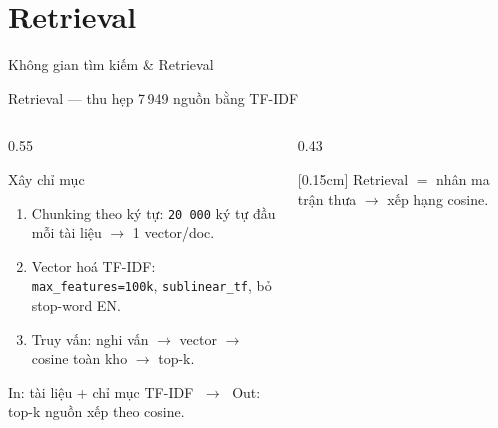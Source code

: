 \documentclass[aspectratio=169,11pt]{beamer}
\def\textbf#1{#1}%
\def\\{ }%
\begin{document}
\section{Retrieval}
{
\begin{frame}[plain]
    \vfill\centering
    \textcolor{hcmusblue}{\textbf{\Huge Không gian tìm kiếm \& Retrieval}}
    \vfill
\end{frame}
}

\begin{frame}{Retrieval — thu hẹp 7\,949 nguồn bằng TF-IDF}
\begin{columns}[T]
\begin{column}{0.55\textwidth}
\begin{block}{Xây chỉ mục}
\scriptsize
\begin{enumerate}\setlength\itemsep{1pt}
  \item \textbf{Chunking theo ký tự:} \texttt{20\,000} ký tự đầu mỗi tài liệu $\rightarrow$ 1 vector/doc.
  \item \textbf{Vector hoá TF-IDF:} \texttt{max\_features=100k}, \texttt{sublinear\_tf}, bỏ stop-word EN.
  \item \textbf{Truy vấn:} nghi vấn $\rightarrow$ vector $\rightarrow$ \textbf{cosine} toàn kho $\rightarrow$ top-k.
\end{enumerate}
\vspace{2pt}\scriptsize \textbf{In:} tài liệu + chỉ mục TF-IDF $\;\rightarrow\;$ \textbf{Out:} top-k nguồn xếp theo cosine.
\end{block}
\end{column}
\begin{column}{0.43\textwidth}
\centering
{}
\\[0.15cm]
{\scriptsize Retrieval $=$ nhân ma trận thưa $\rightarrow$ xếp hạng cosine.}
\end{column}
\end{columns}


\end{frame}
\end{document}
